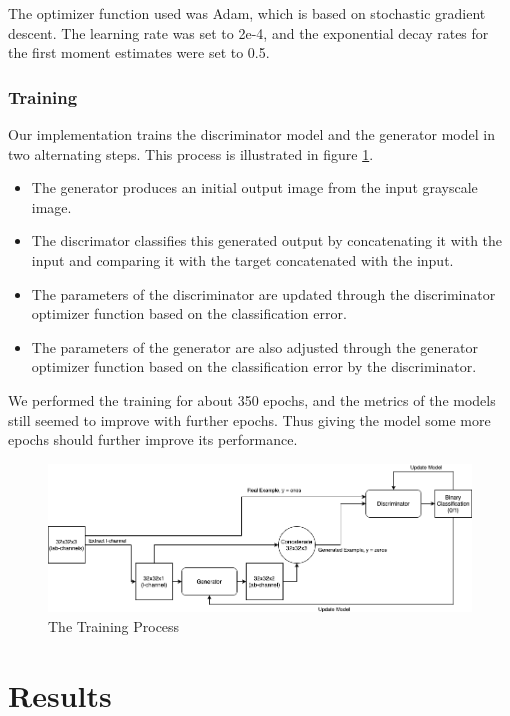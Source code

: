 \documentclass{article}
\begin{document}
The optimizer function used was Adam, which is based on stochastic gradient
descent. The learning rate was set to 2e-4, and the exponential decay rates for
the first moment estimates were set to 0.5.

\subsubsection{Training}

Our implementation trains the discriminator model and the generator model in two
alternating steps. This process is illustrated in figure \ref{fig:training}.

\begin{itemize}
  \item The generator produces an initial output image from the input grayscale image.
  \item The discrimator classifies this generated output by concatenating it with the input and comparing it with the target concatenated with the input.
  \item The parameters of the discriminator are updated through the discriminator optimizer function based on the classification error.
  \item The parameters of the generator are also adjusted through the generator optimizer function based on the classification error by the discriminator.
\end{itemize}

We performed the training for about 350 epochs, and the metrics of the models
still seemed to improve with further epochs. Thus giving the model some more
epochs should further improve its performance.

\begin{figure}[h]
  \centering
  \includegraphics[width=\textwidth]{Training.png}
  \caption{The Training Process}
  \label{fig:training}
  \centering
\end{figure}

\section{Results}
\end{document}
